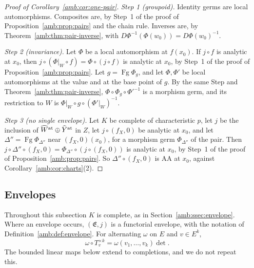 \documentclass[11pt]{amsart}
\theoremstyle{definition}
\theoremstyle{remark}
\numberwithin{equation}{section}
\theoremstyle{plain}
\theoremstyle{definition}
\theoremstyle{plain}
\begin{document}
\begin{proof}[Proof of Corollary~\ref{amb:cor:one-pair}]
\emph{Step 1 (groupoid).} Identity germs are local automorphisms. Composites are, by Step~1 of the proof of Proposition~\ref{amb:prop:pairs} and the chain rule. Inverses are, by Theorem~\ref{amb:thm:pair-inverse}, with $D\Phi^{-1}(\Phi(w_0))=D\Phi(w_0)^{-1}$.

\emph{Step 2 (invariance).} Let $\Phi$ be a local automorphism at $f(x_0)$. If $j\circ f$ is analytic at $x_0$, then $j\circ(\Phi|_W\circ f)=\Phi\circ(j\circ f)$ is analytic at $x_0$, by Step~1 of the proof of Proposition~\ref{amb:prop:pairs}. Let $g=\operatorname{Fg}\Phi_g$, and let $\Phi,\Phi'$ be local automorphisms at the value and at the base point of $g$. By the same Step and Theorem~\ref{amb:thm:pair-inverse}, $\Phi\circ\Phi_g\circ\Phi'^{-1}$ is a morphism germ, and its restriction to $W$ is $\Phi|_W\circ g\circ(\Phi'|_W)^{-1}$.

\emph{Step 3 (no single envelope).} Let $K$ be complete of characteristic $p$, let $j$ be the inclusion of $\widehat W^{\rm at}\oplus\widehat Y^{\rm at}$ in $Z$, let $j\circ(f_X,0)$ be analytic at $x_0$, and let $\Delta''=\operatorname{Fg}\Phi_{\Delta''}$ near $(f_X,0)(x_0)$, for a morphism germ $\Phi_{\Delta''}$ of the pair. Then $j\circ\Delta''\circ(f_X,0)=\Phi_{\Delta''}\circ(j\circ(f_X,0))$ is analytic at $x_0$, by Step~1 of the proof of Proposition~\ref{amb:prop:pairs}. So $\Delta''\circ(f_X,0)$ is AA at $x_0$, against Corollary~\ref{amb:cor:charts}(2).
\end{proof}

\subsection{Envelopes}\label{amb:ssec:proofs-envelope}

Throughout this subsection $K$ is complete, as in Section~\ref{amb:ssec:envelope}. Where an envelope occurs, $(\mathfrak E,j)$ is a functorial envelope, with the notation of Definition~\ref{amb:def:envelope}. For alternating $\omega$ on $E$ and $v\in E^k$,
\begin{equation}\label{amb:c:det}
 \omega\circ T_v^{\times k}=\omega(v_1,\dots,v_k)\det .
\end{equation}
The bounded linear maps below extend to completions, and we do not repeat this.
\end{document}
